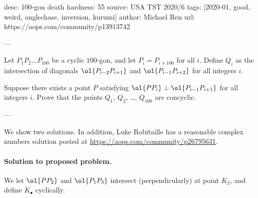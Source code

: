 desc: 100-gon death
hardness: 55
source: USA TST 2020/6
tags: [2020-01, good, weird, anglechase, inversion, kurumi]
author: Michael Ren
url: https://aops.com/community/p13913742

---

Let $P_1P_2 \dots P_{100}$ be a cyclic $100$-gon,
and let $P_i = P_{i+100}$ for all $i$.
Define $Q_i$ as the intersection of diagonals
$\ol{P_{i-2}P_{i+1}}$ and $\ol{P_{i-1}P_{i+2}}$ for all integers $i$.

Suppose there exists a point $P$
satisfying $\ol{PP_i} \perp \ol{P_{i-1}P_{i+1}}$
for all integers $i$.
Prove that the points $Q_1$, $Q_2$, \dots, $Q_{100}$
are concyclic.

---

We show two solutions.
In addition, Luke Robitaille has a reasonable complex numbers solution
posted at \url{https://aops.com/community/p26795631}.

\paragraph{Solution to proposed problem.}
We let $\ol{PP_2}$ and $\ol{P_1P_3}$
intersect (perpendicularly) at point $K_2$,
and define $K_\bullet$ cyclically.

